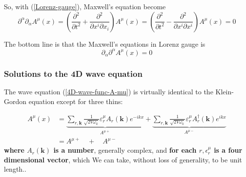 So, with (\ref{Lorenz-gauge}), Maxwell's equation become
\begin{equation}
\partial^{\alpha} \partial_{\alpha} A^{\mu}(x)=\left(\frac{\partial^{2}}{\partial t^{2}}+\frac{\partial^{2}}{\partial x^{i} \partial x_{i}}\right) A^{\mu}(x)=\left(\frac{\partial^{2}}{\partial t^{2}}-\frac{\partial^{2}}{\partial x^{i} \partial x^{i}}\right) A^{\mu}(x)=0
\end{equation}
\begin{qt}
The bottom line is that the Maxwell's equations in Lorenz gauge is
    \begin{equation}
\partial_{\alpha} \partial^{\alpha} A^{\mu}(x)=0
\label{4D-wave-func-A-mu}
\end{equation}
\end{qt}
\subsubsection{Solutions to the 4D wave equation}
The wave equation (\ref{4D-wave-func-A-mu}) is virtually identical to the Klein-Gordon equation except for three thins:
\begin{qt}
\begin{equation}
\begin{aligned}
A^{\mu}(x) &=\underbrace{\sum_{r, \mathbf{k}} \frac{1}{\sqrt{2 V{\omega_k}}} \varepsilon_{r}^{\mu} A_{r}(\mathbf{k}) e^{-i k x}}_{A^{\mu+}}+\underbrace{\sum_{r, \mathbf{k}} \frac{1}{\sqrt{2 V{\omega_k}}} \varepsilon_{r}^{\mu} A_{r}^{\dagger}(\mathbf{k}) e^{i k x}}_{A^{\mu-}}  \\
&=A^{\mu+} \quad+\quad A^{\mu-}
\end{aligned}
\label{4D-maxwell-solution}
\end{equation}
\textbf{where $A_{r}(\mathbf{k})$ is a number}, generally complex, and \textbf{for each $r, \epsilon_{r}^{\mu}$ is a four dimensional vector}, which We can take, without loss of generality, to be unit length..
\end{qt}
